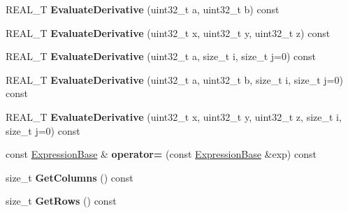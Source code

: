 \begin{DoxyCompactItemize}
\item 
\hypertarget{structatl_1_1_expression_base_a2e61d3bfdc764f0d16e6eb572b25c363}{R\+E\+A\+L\+\_\+\+T {\bfseries Evaluate\+Derivative} (uint32\+\_\+t a, uint32\+\_\+t b) const }\label{structatl_1_1_expression_base_a2e61d3bfdc764f0d16e6eb572b25c363}

\item 
\hypertarget{structatl_1_1_expression_base_aa1f95c771b199c9a7e4b50812c9403bd}{R\+E\+A\+L\+\_\+\+T {\bfseries Evaluate\+Derivative} (uint32\+\_\+t x, uint32\+\_\+t y, uint32\+\_\+t z) const }\label{structatl_1_1_expression_base_aa1f95c771b199c9a7e4b50812c9403bd}

\item 
\hypertarget{structatl_1_1_expression_base_a0a68467741857a259ac2a7fd20a978b3}{R\+E\+A\+L\+\_\+\+T {\bfseries Evaluate\+Derivative} (uint32\+\_\+t a, size\+\_\+t i, size\+\_\+t j=0) const }\label{structatl_1_1_expression_base_a0a68467741857a259ac2a7fd20a978b3}

\item 
\hypertarget{structatl_1_1_expression_base_a3842851b592ddca24931e79576c4391b}{R\+E\+A\+L\+\_\+\+T {\bfseries Evaluate\+Derivative} (uint32\+\_\+t a, uint32\+\_\+t b, size\+\_\+t i, size\+\_\+t j=0) const }\label{structatl_1_1_expression_base_a3842851b592ddca24931e79576c4391b}

\item 
\hypertarget{structatl_1_1_expression_base_a253be8df62a01657fee080feccfe028e}{R\+E\+A\+L\+\_\+\+T {\bfseries Evaluate\+Derivative} (uint32\+\_\+t x, uint32\+\_\+t y, uint32\+\_\+t z, size\+\_\+t i, size\+\_\+t j=0) const }\label{structatl_1_1_expression_base_a253be8df62a01657fee080feccfe028e}

\item 
\hypertarget{structatl_1_1_expression_base_a6607aa1b435c1b21935cca5bceb4ba82}{const \hyperlink{structatl_1_1_expression_base}{Expression\+Base} \& {\bfseries operator=} (const \hyperlink{structatl_1_1_expression_base}{Expression\+Base} \&exp) const }\label{structatl_1_1_expression_base_a6607aa1b435c1b21935cca5bceb4ba82}

\item 
\hypertarget{structatl_1_1_expression_base_a65be9dccfdbecea0460627d628a533e7}{size\+\_\+t {\bfseries Get\+Columns} () const }\label{structatl_1_1_expression_base_a65be9dccfdbecea0460627d628a533e7}

\item 
\hypertarget{structatl_1_1_expression_base_af1bef71d83cb5cbe01a1b63b041d8563}{size\+\_\+t {\bfseries Get\+Rows} () const }\label{structatl_1_1_expression_base_af1bef71d83cb5cbe01a1b63b041d8563}


\end{DoxyCompactItemize}
